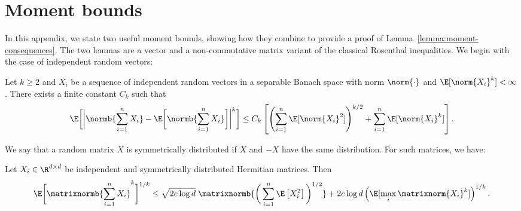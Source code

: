 \documentclass[11pt,twoside]{article}
\theoremstyle{definition}
\begin{document}




\section{Moment bounds}
\label{appendix:moment-bounds}

In this appendix, we state two useful moment bounds, showing how they
combine to provide a proof of Lemma~\ref{lemma:moment-consequences}.
The two lemmas are a vector and a non-commutative matrix variant of
the classical Rosenthal inequalities.  We begin with the case of
independent random vectors: \\
%
\begin{lemma}
  \label{lemma:vector-rosenthal}
  Let $k \ge 2$ and $X_i$ be a sequence of independent random vectors in a
  separable Banach space with norm $\norm{\cdot}$ and $\E[\norm{X_i}^k] <
  \infty$. There exists a finite constant $C_k$ such that
  \begin{equation*}
    \E\bigg[\bigg|\normb{\sum_{i=1}^n X_i} -
      \E\bigg[\normb{\sum_{i=1}^n X_i}\bigg]\bigg|^k\bigg] \le C_k
    \left[\left(\sum_{i=1}^n \E[\norm{X_i}^2]\right)^{k/2} +
      \sum_{i=1}^n \E[\norm{X_i}^k]\right].
  \end{equation*}
\end{lemma}


We say that a random matrix $X$ is symmetrically distributed if $X$
and $-X$ have the same distribution.  For such matrices, we have:
\begin{lemma}
  \label{lemma:matrix-rosenthal}
Let $X_i \in \R^{d \times d}$ be independent and symmetrically
distributed Hermitian matrices. Then
  \begin{equation*}
    \E\bigg[\matrixnormb{\sum_{i=1}^n X_i}^k\bigg]^{1/k}
    \le \sqrt{2 e \log d} \;
    \matrixnormb{\bigg(\sum_{i=1}^n \E\left[X_i^2\right]\bigg)^{1/2}}
    + 2 e \log d \left(\E[\max_i\matrixnorm{X_i}^k]\right)^{1/k}.
  \end{equation*}
\end{lemma}
\end{document}

